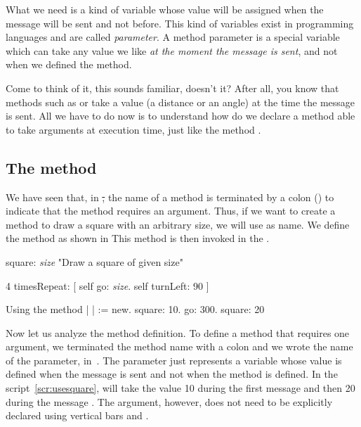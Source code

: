 What we need is a kind of variable whose value will be assigned when the message will be sent and not before. This kind of variables exist in programming languages and are called \emph{parameter}. A method parameter is a special variable which can take any value we like \emph{at the moment the message is sent}, and not when we defined the method.

Come to think of it, this sounds familiar, doesn't it? After all, you know that methods such as \go or \turnLeft take a value (a distance or an angle) at the time the message is sent. All we have to do now is to understand how do we declare a method able to take arguments at execution time, just like the method \go.

\subsection{The method }
We have seen that, in \st, the name of a method is terminated by a colon (\ct{:}) to indicate that the method requires an argument. Thus, if we want to create a method to draw a square with an arbitrary size, we will use  as name. We define the method  as shown in 
This method is then invoked in the .

\begin{method}\label{mth:squareArguments}
square: \emph{size}
   "Draw a square of given size"

   4 timesRepeat: 
                    [ self go: \emph{size}.
                    self turnLeft: 90 ]
\end{method}

\begin{scriptwithtitle}{Using the method }\label{scr:usesquare}
| \caro |
\caro := \Turtle new.
\caro square: 10.
\caro go: 300.
\caro square: 20
\end{scriptwithtitle}

Now let us analyze the method definition.  To define a method that requires one  argument, we terminated the method name with a colon \ct{:} and we wrote the name of the parameter, \eg {} in~. The parameter just represents a variable whose value is defined when the message is sent and not when the method is defined. In the script~\ref{scr:usesquare},  will take the value 10 during the first message  and then 20 during the message .  The argument, however, does not need to be explicitly declared using vertical bars \ct{|} and \ct{|}.
 
